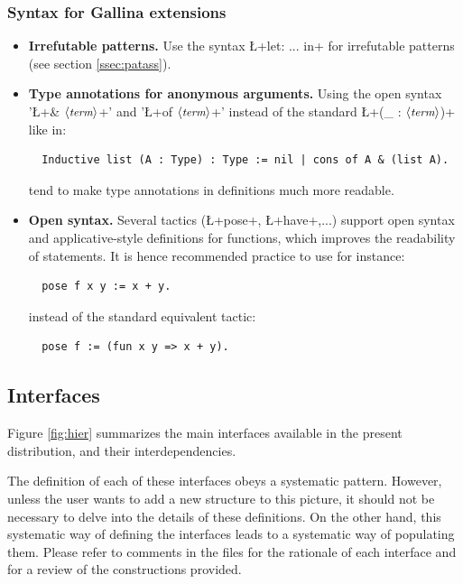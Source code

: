 \subsubsection*{Syntax for Gallina extensions}
\begin{itemize}
\item {\bf Irrefutable patterns.} Use the \ssr{} syntax
\L+let: ... in+ for irrefutable patterns (see section
\ref{ssec:patass}).
\item {\bf Type annotations for anonymous arguments.} Using the open
  \ssr{} syntax '\L+& $\langle\mbox{\itshape\rmfamily\small term}\rangle$+' and '\L+of $\langle\mbox{\itshape\rmfamily\small term}\rangle$+' instead of the
  standard  \L+(_ : $\langle\mbox{\itshape\rmfamily\small term}\rangle$)+ like in:
\begin{lstlisting}
  Inductive list (A : Type) : Type := nil | cons of A & (list A).
\end{lstlisting}
tend to make type annotations in definitions much more readable.
\item{\bf Open syntax.} Several \ssr{} tactics (\L+pose+, \L+have+,...)
  support open syntax and applicative-style definitions for functions,
  which improves the readability of statements.
  It is hence recommended practice to use for instance:
\begin{lstlisting}
  pose f x y := x + y.
\end{lstlisting}
instead of the standard \Coq{} equivalent tactic:
\begin{lstlisting}
  pose f := (fun x y => x + y).
\end{lstlisting}

\end{itemize}

\subsection{Interfaces}

Figure \ref{fig:hier} summarizes the main interfaces available in
the present distribution, and their interdependencies. %

The definition of each of these interfaces obeys a systematic
pattern. However, unless the user wants to add a new structure to
this picture, it should not be necessary to delve into the details of
these definitions. On the other hand, this systematic way of defining
the interfaces leads to a systematic way of populating them. Please
refer to comments in the files for the rationale of each interface and
for a review of the constructions provided.

